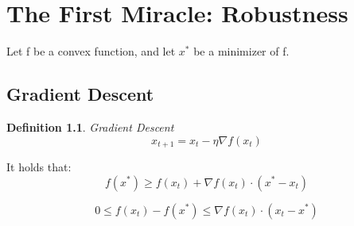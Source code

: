 \documentclass[11pt]{book} %
\newtheorem{definition}{Definition}[section]
\begin{document}






\chapter{The First Miracle: Robustness}

Let f be a convex function, and let $x^*$ be a minimizer of f. 

\section{Gradient Descent}
\begin{definition}{Gradient Descent} \\
    \begin{equation}
       x_{t+1} = x_t - \eta \nabla f(x_t) 
    \end{equation}
\end{definition}

It holds that:
\begin{equation}
    f(x^*) \geq f(x_t) + \nabla f(x_t) \cdot (x^* - x_t)
\end{equation}

\begin{equation}
    0 \leq f(x_t) - f(x^*) \leq \nabla f(x_t) \cdot (x_t - x^*) 
\end{equation}
\end{document}
